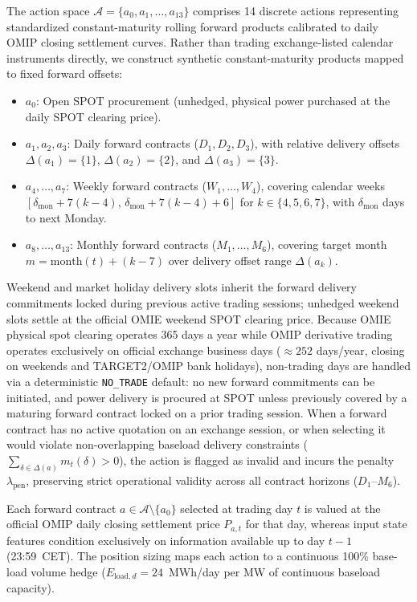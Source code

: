 The action space $\mathcal{A} = \{a_0, a_1, \dots, a_{13}\}$ comprises 14 discrete actions representing standardized constant-maturity rolling forward products calibrated to daily OMIP closing settlement curves. Rather than trading exchange-listed calendar instruments directly, we construct synthetic constant-maturity products mapped to fixed forward offsets:
\begin{itemize}
    \item $a_0$: Open SPOT procurement (unhedged, physical power purchased at the daily SPOT clearing price).
    \item $a_1, a_2, a_3$: Daily forward contracts ($D_1, D_2, D_3$), with relative delivery offsets $\Delta(a_1) = \{1\}$, $\Delta(a_2) = \{2\}$, and $\Delta(a_3) = \{3\}$.
    \item $a_4, \dots, a_7$: Weekly forward contracts ($W_1, \dots, W_4$), covering calendar weeks $[\delta_{\text{mon}} + 7(k-4),\, \delta_{\text{mon}} + 7(k-4) + 6]$ for $k \in \{4, 5, 6, 7\}$, with $\delta_{\text{mon}}$ days to next Monday.
    \item $a_8, \dots, a_{13}$: Monthly forward contracts ($M_1, \dots, M_6$), covering target month $m = \text{month}(t) + (k-7)$ over delivery offset range $\Delta(a_k)$.
\end{itemize}
Weekend and market holiday delivery slots inherit the forward delivery commitments locked during previous active trading sessions; unhedged weekend slots settle at the official OMIE weekend SPOT clearing price. Because OMIE physical spot clearing operates 365 days a year while OMIP derivative trading operates exclusively on official exchange business days ($\approx 252$ days/year, closing on weekends and TARGET2/OMIP bank holidays), non-trading days are handled via a deterministic \texttt{NO\_TRADE} default: no new forward commitments can be initiated, and power delivery is procured at SPOT unless previously covered by a maturing forward contract locked on a prior trading session. When a forward contract has no active quotation on an exchange session, or when selecting it would violate non-overlapping baseload delivery constraints ($\sum_{\delta \in \Delta(a)} m_t(\delta) > 0$), the action is flagged as invalid and incurs the penalty $\lambda_{\text{pen}}$, preserving strict operational validity across all contract horizons ($D_1$--$M_6$).

Each forward contract $a \in \mathcal{A} \setminus \{a_0\}$ selected at trading day $t$ is valued at the official OMIP daily closing settlement price $P_{a, t}$ for that day, whereas input state features condition exclusively on information available up to day $t-1$ (23:59~CET). The position sizing maps each action to a continuous 100\% base-load volume hedge ($E_{\text{load}, d} = 24$~MWh/day per MW of continuous baseload capacity).

